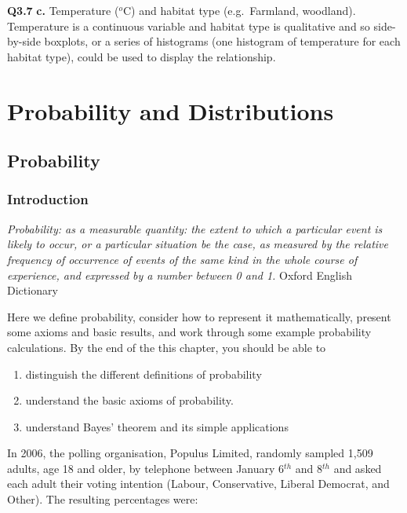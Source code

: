 \documentclass[
  oneside]{krantz}
\providecommand{\tightlist}{%
  \setlength{\itemsep}{0pt}\setlength{\parskip}{0pt}}
\begin{document}
\textbf{Q3.7} \textbf{c.} Temperature (\(^o\)C) and habitat type (e.g.~Farmland, woodland). Temperature is a continuous variable and habitat type is qualitative and so side-by-side boxplots, or a series of histograms (one histogram of temperature for each habitat type), could be used to display the relationship.

\hypertarget{part-probability-and-distributions}{%
\part{Probability and Distributions}\label{part-probability-and-distributions}}

\hypertarget{probability}{%
\chapter{Probability}\label{probability}}

\hypertarget{INTprob}{%
\section{Introduction}\label{INTprob}}

{ \emph{Probability: as a measurable quantity: the extent to which a particular event is likely to occur, or a particular situation be the case, as measured by the relative frequency of occurrence of events of the same kind in the whole course of experience, and expressed by a number between 0 and 1.}
Oxford English Dictionary \citeyearpar{dictionary1989oxford}}

Here we define probability, consider how to represent it mathematically, present some axioms and basic results, and work through some example probability calculations. By the end of the this chapter, you should be able to

\begin{enumerate}
\def\labelenumi{\arabic{enumi}.}
\tightlist
\item
  distinguish the different definitions of probability
\item
  understand the basic axioms of probability.
\item
  understand Bayes' theorem and its simple applications
\end{enumerate}

In 2006, the polling organisation, Populus Limited, randomly sampled 1,509 adults, age 18 and older, by telephone between January 6\(^{th}\) and 8\(^{th}\) and asked each adult their voting intention (Labour, Conservative, Liberal Democrat, and Other). The resulting percentages were:
\end{document}
